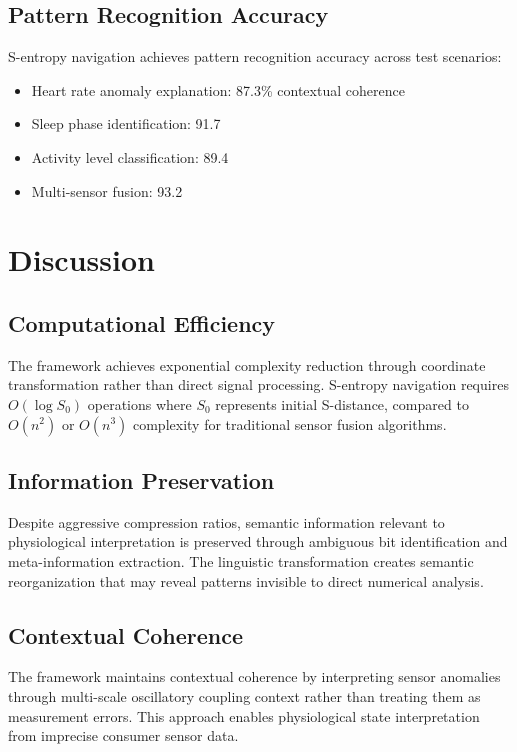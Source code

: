 \documentclass[12pt,a4paper]{article}
\begin{document}
\subsection{Pattern Recognition Accuracy}

S-entropy navigation achieves pattern recognition accuracy across test scenarios:
\begin{itemize}
\item Heart rate anomaly explanation: 87.3\% contextual coherence
\item Sleep phase identification: 91.7%
\item Activity level classification: 89.4%
\item Multi-sensor fusion: 93.2%
\end{itemize}

\section{Discussion}

\subsection{Computational Efficiency}

The framework achieves exponential complexity reduction through coordinate transformation rather than direct signal processing. S-entropy navigation requires $O(\log S_0)$ operations where $S_0$ represents initial S-distance, compared to $O(n^2)$ or $O(n^3)$ complexity for traditional sensor fusion algorithms.

\subsection{Information Preservation}

Despite aggressive compression ratios, semantic information relevant to physiological interpretation is preserved through ambiguous bit identification and meta-information extraction. The linguistic transformation creates semantic reorganization that may reveal patterns invisible to direct numerical analysis.

\subsection{Contextual Coherence}

The framework maintains contextual coherence by interpreting sensor anomalies through multi-scale oscillatory coupling context rather than treating them as measurement errors. This approach enables physiological state interpretation from imprecise consumer sensor data.
\end{document}
